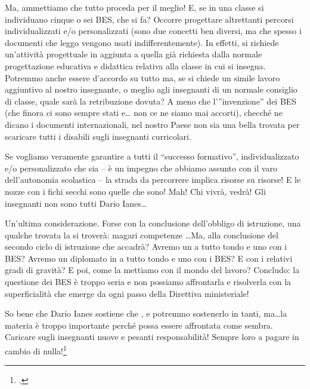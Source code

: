 Ma, ammettiamo che tutto proceda per il meglio! E, se in una classe si individuano cinque o sei BES, che si fa? Occorre progettare altrettanti percorsi individualizzati e/o personalizzati (sono due concetti ben diversi, ma che spesso i documenti che leggo vengono usati indifferentemente). In effetti, si richiede un'attività progettuale in aggiunta a quella già richiesta dalla normale progettazione educativa e didattica relativa alla classe in cui si insegna. Potremmo anche essere d'accordo su tutto ma, se si chiede un simile lavoro aggiuntivo al nostro insegnante, o meglio agli insegnanti di un normale consiglio di classe, quale sarà la retribuzione dovuta? A meno che l’”invenzione” dei BES (che finora ci sono sempre stati e… non ce ne siamo mai accorti), checché ne dicano i documenti internazionali, nel nostro Paese non sia una bella trovata per scaricare tutti i disabili sugli insegnanti curricolari.

Se vogliamo veramente garantire a tutti il “successo formativo”, individualizzato e/o personalizzato che sia – è un impegno che abbiamo assunto con il varo dell'autonomia scolastica – la strada da percorrere implica risorse su risorse! E le nozze con i fichi secchi sono quelle che sono! Mah! Chi vivrà, vedrà! Gli insegnanti non sono tutti Dario Ianes\dots

Un'ultima considerazione. Forse con la conclusione dell'obbligo di istruzione, una qualche trovata la si troverà: magari competenze \dots Ma, alla conclusione del secondo ciclo di istruzione che accadrà? Avremo un  a tutto tondo e uno con i BES? Avremo un diplomato in  a tutto tondo e uno con i BES? E con i relativi gradi di gravità? E poi, come la mettiamo con il mondo del lavoro? Concludo: la questione dei BES è troppo seria e non possiamo affrontarla e risolverla con la superficialità che emerge da ogni passo della Direttiva ministeriale!

So bene che Dario Ianes sostiene che , e potremmo sostenerlo in tanti, ma\dots la materia è troppo importante perché possa essere affrontata come sembra. Caricare sugli insegnanti nuove e pesanti responsabilità! Sempre loro a pagare in cambio di nulla!\footcite{Tiriticco2013}


